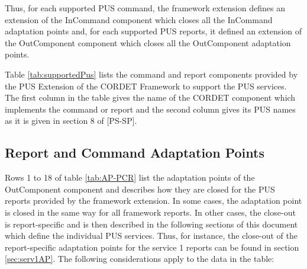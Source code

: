\documentclass[a4paper,10pt]{article}
\begin{document}
Thus, for each supported PUS command, the framework extension defines an extension of the InCommand component which closes all the InCommand adaptation points and, for each supported PUS reports, it defined an extension of the OutComponent component which closes all the OutComponent adaptation points.

Table \ref{tab:supportedPus} lists the command and report components provided by the PUS Extension of the CORDET Framework to support the PUS services. The first column in the table gives the name of the CORDET component which implements the command or report and the second column gives its PUS names as it is given in section 8 of [PS-SP].

\subsection{Report and Command Adaptation Points}\label{sec:repCmdAP}
Rows 1 to 18 of table \ref{tab:AP-PCR} list the adaptation points of the OutComponent component and describes how they are closed for the PUS reports provided by the framework extension. In some cases, the adaptation point is closed in the same way for all framework reports. In other cases, the close-out is report-specific and is then described in the following sections of this document which define the individual PUS services. Thus, for instance, the close-out of the report-specific adaptation points for the service 1 reports can be found in section \ref{sec:serv1AP}. The following considerations apply to the data in the table:
\end{document}
